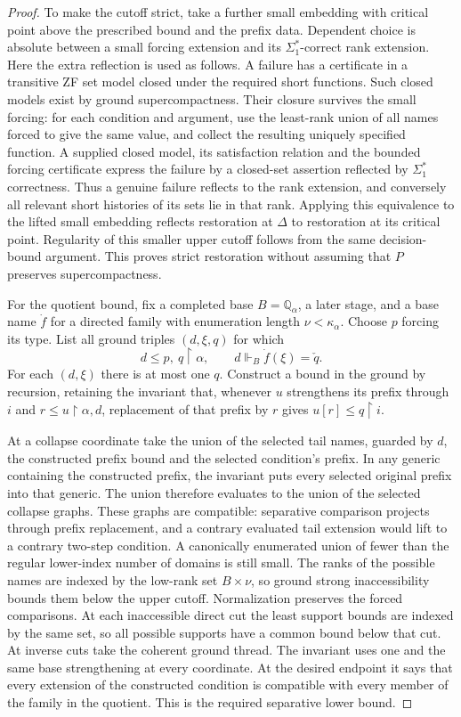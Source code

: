 \documentclass[11pt,a4paper]{amsart}
\newcommand{\restr}{\mathbin{\upharpoonright}}
\theoremstyle{plain}
\theoremstyle{definition}
\theoremstyle{remark}
\begin{document}
\begin{proof}
To make the cutoff strict, take a further small embedding with
critical point above the prescribed bound and the prefix data.
Dependent choice is absolute between a small forcing extension
and its $\Sigma_1^*$-correct rank extension.  Here the extra
reflection is used as follows.  A failure has a certificate in a
transitive ZF set model closed under the required short functions.
Such closed models exist by ground supercompactness.  Their
closure survives the small forcing: for each condition and
argument, use the least-rank union of all names forced to give
the same value, and collect the resulting uniquely specified
function.  A supplied closed model, its satisfaction relation
and the bounded forcing certificate express the failure by a
closed-set assertion reflected by $\Sigma_1^*$ correctness.
Thus a genuine failure reflects to the rank extension, and
conversely all relevant short histories of its sets lie in that
rank.  Applying this equivalence to the lifted small embedding
reflects restoration at $\Delta$ to restoration at its critical
point.  Regularity of this smaller upper cutoff follows from the
same decision-bound argument.  This proves strict restoration
without assuming that $P$ preserves supercompactness.

For the quotient bound, fix a completed base $B=\mathbb Q_\alpha$,
a later stage, and a base name $\dot f$ for a directed family with
enumeration length $\nu<\kappa_\alpha$.  Choose $p$ forcing its type.
List all ground triples $(d,\xi,q)$ for which
\[
d\leq p,\ q\restr\alpha,\qquad
d\Vdash_B\dot f(\xi)=\check q .
\]
For each $(d,\xi)$ there is at most one $q$.  Construct a bound in
the ground by recursion, retaining the invariant that, whenever
$u$ strengthens its prefix through $i$ and
$r\leq u\restr\alpha,d$, replacement of that prefix by $r$ gives
$u[r]\leq q\restr i$.

At a collapse coordinate take the union of the selected tail names,
guarded by $d$, the constructed prefix bound and the selected
condition's prefix.  In any generic containing the constructed
prefix, the invariant puts every selected original prefix into
that generic.  The union therefore evaluates to the union of the
selected collapse graphs.  These graphs are compatible:
separative comparison projects through prefix replacement, and
a contrary evaluated tail extension would lift to a contrary
two-step condition.  A canonically enumerated union of fewer than
the regular lower-index number of domains is still small.
The ranks of the possible names are indexed by the low-rank set
$B\times\nu$, so ground strong inaccessibility bounds them below
the upper cutoff.  Normalization preserves the forced comparisons.
At each inaccessible direct cut the least support bounds are
indexed by the same set, so all possible supports have a common
bound below that cut.  At inverse cuts take the coherent ground
thread.  The invariant uses one and the same base strengthening
at every coordinate.  At the desired endpoint it says that every
extension of the constructed condition is compatible with every
member of the family in the quotient.  This is the required
separative lower bound.


\end{proof}
\end{document}
